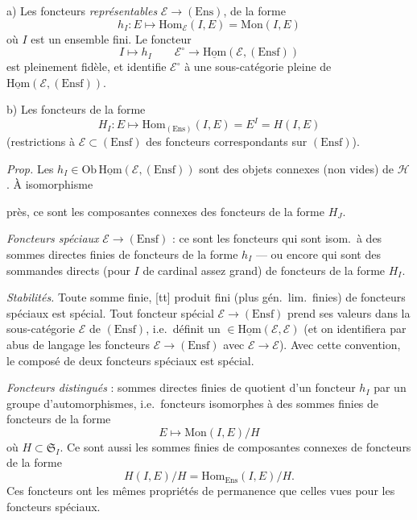 \documentclass[11pt,a4paper]{article}
\begin{document}
a) Les foncteurs \emph{représentables} $\mathcal{E} \to (\mathrm{Ens})$, de la
forme
\[
  h_I : E \mapsto \mathrm{Hom}_{\mathcal{E}}(I, E) = \mathrm{Mon}(I, E)
\]
où $I$ est un ensemble fini. Le foncteur
\[
  I \mapsto h_I \qquad \mathcal{E}^{\circ} \to
  \underline{\mathrm{Hom}}(\mathcal{E}, (\mathrm{Ensf}))
\]
est pleinement fidèle, et identifie $\mathcal{E}^{\circ}$ à une
sous-catégorie pleine de
$\underline{\mathrm{Hom}}(\mathcal{E}, (\mathrm{Ensf}))$.

b) Les foncteurs de la forme
\[
  H_I : E \mapsto \mathrm{Hom}_{(\mathrm{Ens})}(I, E) = E^I = H(I, E)
\]
(restrictions à $\mathcal{E} \subset (\mathrm{Ensf})$ des foncteurs
correspondants sur $(\mathrm{Ensf})$).

\emph{Prop.} Les $h_I \in \mathrm{Ob}\,\underline{\mathrm{Hom}}(\mathcal{E},
(\mathrm{Ensf}))$ sont des objets connexes (non vides) de $\mathcal{H}$. À
isomorphisme

près, ce sont les composantes connexes des foncteurs de la forme $H_J$.

\emph{Foncteurs spéciaux} $\mathcal{E} \to (\mathrm{Ensf})$ : ce sont les
foncteurs qui sont  isom.\ à des sommes directes finies de
foncteurs de la forme $h_I$ — ou encore qui sont des sommandes directs (pour
$I$ de cardinal assez grand) de foncteurs de la forme $H_I$.

\emph{Stabilités.} Toute somme finie, \struck{\ill{}} [tt] produit fini (plus gén.\
lim.\ finies) de foncteurs spéciaux est spécial. Tout foncteur spécial
$\mathcal{E} \to (\mathrm{Ensf})$ prend ses valeurs dans la sous-catégorie
$\mathcal{E}$ de $(\mathrm{Ensf})$, i.e.\ définit un \struck{dans}
$\in \underline{\mathrm{Hom}}(\mathcal{E}, \mathcal{E})$ (et on identifiera
par abus de langage les foncteurs $\mathcal{E} \to (\mathrm{Ensf})$
avec $\mathcal{E} \to \mathcal{E}$). Avec cette
convention, le composé de deux foncteurs spéciaux est spécial.

\emph{Foncteurs distingués} : sommes directes finies de quotient d'un
foncteur \struck{spécial par} $h_I$ par un groupe d'automorphismes, i.e.\
foncteurs isomorphes à des sommes finies de foncteurs de la forme
\[
  E \mapsto \mathrm{Mon}(I, E) / H
\]
où $H \subset \mathfrak{S}_I$. Ce sont aussi les sommes finies de composantes
connexes de foncteurs de la forme
\[
  H(I, E)/H = \mathrm{Hom}_{\mathrm{Ens}}(I, E)/H .
\]
Ces foncteurs ont les mêmes propriétés de permanence que celles vues pour les
foncteurs spéciaux.
\end{document}
